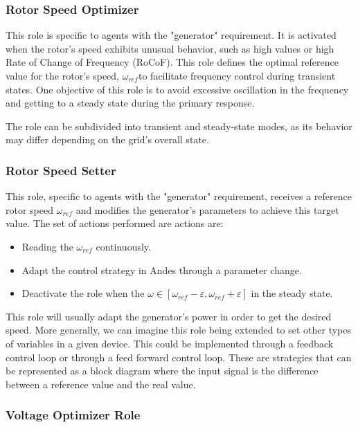 \documentclass{article}
\begin{document}
\subsubsection*{Rotor Speed Optimizer}

This role is specific to agents with the "generator" requirement. It is activated when the rotor's speed exhibits unusual behavior, such as high values or high Rate of Change of Frequency (RoCoF). This role defines the optimal reference value for the rotor's speed, $\omega_{ref}$to facilitate frequency control during transient states. One objective of this role is to avoid excessive oscillation in the frequency and getting to a steady state during the primary response.

The role can be subdivided into transient and steady-state modes, as its behavior may differ depending on the grid's overall state.  

\subsubsection*{Rotor Speed Setter}

This role, specific to agents with the "generator" requirement, receives a reference rotor speed $\omega_{ref}$ and modifies the generator's parameters to achieve this target value. The set of actions performed are actions are:

\begin{itemize}
    \item Reading the $\omega_{ref}$ continuously.
    \item Adapt the control strategy in Andes through a parameter change.
    \item Deactivate the role when the $\omega \in [\omega_{ref} - \varepsilon, \omega_{ref} + \varepsilon]$ in the steady state.
\end{itemize}

This role will usually adapt the generator's power in order to get the desired speed. More generally, we can imagine this role being extended to set other types of variables in a given device. This could be implemented through a feedback control loop or through a feed forward control loop. These are strategies that can be represented as a block diagram where the input signal is the difference between a reference value and the real value. 

\subsubsection*{Voltage Optimizer Role}
\end{document}

